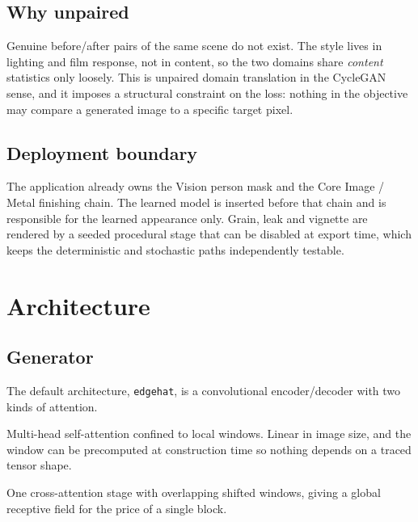 \documentclass[11pt,a4paper]{article}
\newcommand{\code}[1]{\texttt{#1}}
\begin{document}
\subsection{Why unpaired}

Genuine before/after pairs of the same scene do not exist. The style lives in
lighting and film response, not in content, so the two domains share
\emph{content} statistics only loosely. This is unpaired domain translation in
the CycleGAN sense, and it imposes a structural constraint on the loss: nothing
in the objective may compare a generated image to a specific target pixel.

\subsection{Deployment boundary}

The application already owns the Vision person mask and the Core Image / Metal
finishing chain. The learned model is inserted before that chain and is
responsible for the learned appearance only. Grain, leak and vignette are
rendered by a seeded procedural stage that can be disabled at export time, which
keeps the deterministic and stochastic paths independently testable.

\section{Architecture}

\subsection{Generator}

The default architecture, \code{edgehat}, is a convolutional encoder/decoder
with two kinds of attention.

\begin{description}[leftmargin=1.4em,style=nextline]
  \item[\code{EdgeViT} blocks] Multi-head self-attention confined to local
        windows. Linear in image size, and the window can be precomputed at
        construction time so nothing depends on a traced tensor shape.
  \item[HAT block] One cross-attention stage with overlapping shifted windows,
        giving a global receptive field for the price of a single block.
\end{description}
\end{document}
